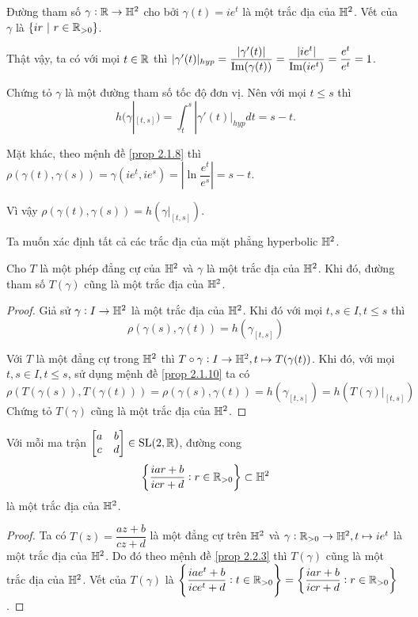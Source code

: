 \begin{exam*}
    Đường tham số $\gamma:\mathbb{R} \to \mathbb{H}^2$ cho bởi $\gamma(t) = ie^{t}$ là một trắc địa của $\mathbb{H}^2$. Vết của $\gamma$ là $\{ir~|~r\in \mathbb{R}_{>0}\}$.

    Thật vậy, ta có với mọi $t\in \mathbb{R}$ thì $|\gamma'(t)|_{hyp} = \dfrac{|\gamma'(t)|}{\operatorname{Im}(\gamma(t))} = \dfrac{|ie^t|}{\operatorname{Im}(ie^t)} = \dfrac{e^t}{e^t} = 1$.
    
    Chứng tỏ $\gamma$ là một đường tham số tốc độ đơn vị. 
    Nên với mọi $t\leq s$ thì \[h(\gamma|_{[t,s]}) = \int_t^s|\gamma'(t)|_{hyp}dt = s-t.\]

    Mặt khác, theo mệnh đề \ref{prop 2.1.8} thì $ \rho(\gamma(t),\gamma(s)) = \gamma(ie^t,ie^s) = \left|\ln{\dfrac{e^t}{e^s}}\right| = s-t$.

    Vì vậy $\rho(\gamma(t),\gamma(s)) = h(\gamma|_{[t,s]})$.
\end{exam*}
Ta muốn xác định tất cả các trắc địa của mặt phẳng hyperbolic $\mathbb{H}^2$.
\begin{prop}\label{prop 2.2.3}
    Cho $T$ là một phép đẳng cự của $\mathbb{H}^2$ và $\gamma$ là một trắc địa của $\mathbb{H}^2$. Khi đó, đường tham số $T(\gamma)$ cũng là một trắc địa của $\mathbb{H}^2$.
\end{prop}
\begin{proof}
    Giả sử $\gamma: I \to \mathbb{H}^2$ là một trắc địa của $\mathbb{H}^2$. Khi đó với mọi $t,s \in I, t \leq s$ thì
    \[\rho(\gamma(s),\gamma(t)) = h(\gamma_{[t,s]})\]
    
    Với $T$ là một đẳng cự trong $\mathbb{H}^2$ thì $T\circ \gamma: I \to \mathbb{H}^2, t \mapsto T(\gamma(t))$. Khi đó, với mọi $t,s \in I, t \leq s$, sử dụng mệnh đề \ref{prop 2.1.10} ta có
    \[\rho(T(\gamma(s)),T(\gamma(t))) = \rho(\gamma(s),\gamma(t)) = h(\gamma_{[t,s]}) = h(T(\gamma)|_{[t,s]})\]
    Chứng tỏ $T(\gamma)$ cũng là một trắc địa của $\mathbb{H}^2$.
\end{proof}
\begin{cor}\label{cor 2.2.4}
    Với mỗi ma trận $\begin{bmatrix} a & b \\ c & d \\ \end{bmatrix} \in \operatorname{SL}(2,\mathbb{R})$, đường cong 
    \[\left\{\dfrac{iar+b}{icr+d}: r \in \mathbb{R}_{>0}\right\} \subset \mathbb{H}^2\]
    là một trắc địa của $\mathbb{H}^2$.
\end{cor}
\begin{proof}
    Ta có $T(z) = \dfrac{az+b}{cz+d}$ là một đẳng cự trên $\mathbb{H}^2$ và $\gamma: \mathbb{R}_{>0} \to \mathbb{H}^2, t\mapsto ie^t$ là một trắc địa của $\mathbb{H}^2$. Do đó theo mệnh đề \ref{prop 2.2.3} thì $T(\gamma)$ cũng là một trắc địa của $\mathbb{H}^2$. Vết của $T(\gamma)$ là $\left\{\dfrac{iae^t+b}{ice^t+d}: t \in \mathbb{R}_{>0}\right\} = \left\{\dfrac{iar+b}{icr+d}: r \in \mathbb{R}_{>0}\right\}$.
\end{proof}
